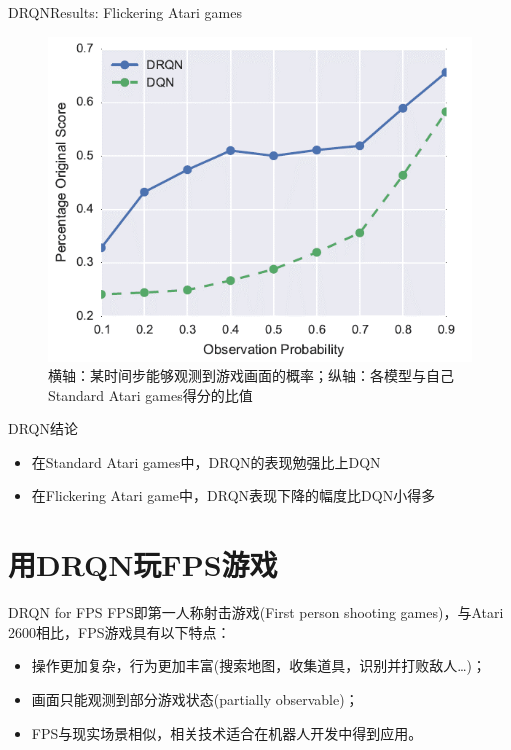 \documentclass[10pt]{beamer}
\begin{document}
	\begin{frame}{DRQN}{Results: Flickering Atari games}
		\begin{figure}
			\centering
			\includegraphics[width=0.7\linewidth]{pictures/flickering-atari-result}
			\caption{横轴：某时间步能够观测到游戏画面的概率；纵轴：各模型与自己Standard Atari games得分的比值}
			\label{fig:flickering-atari-result}
		\end{figure}
		
	\end{frame}

	\begin{frame}{DRQN}{结论}
		\begin{itemize}
				\item 在Standard Atari games中，DRQN的表现勉强比上DQN
				\item 在Flickering Atari game中，DRQN表现下降的幅度比DQN小得多
		\end{itemize}
	
	\end{frame}
	
	\section{用DRQN玩FPS游戏}

	\begin{frame}{DRQN for FPS}{}
		FPS即第一人称射击游戏(First person shooting games)，与Atari 2600相比，FPS游戏具有以下特点：
	
		\begin{itemize}
			\item 操作更加复杂，行为更加丰富(搜索地图，收集道具，识别并打败敌人…)；
			\item 画面只能观测到部分游戏状态(partially observable)；
			\item FPS与现实场景相似，相关技术适合在机器人开发中得到应用。
		\end{itemize}
	\end{frame}
\end{document}
